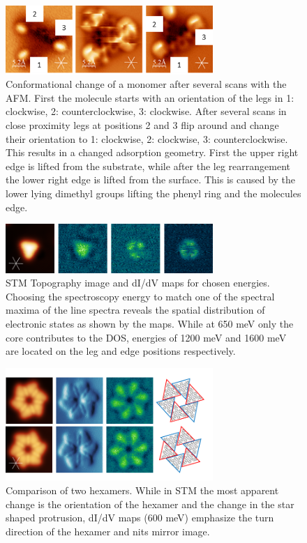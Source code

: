 \begin{figure}[] \centering
	\includegraphics[width=0.7\textwidth]{./images/hbbnc-ag-111-leg-flip}
	\caption{Conformational change of a monomer after several scans with the AFM. First the molecule starts with an orientation of the legs in 1: clockwise, 2: counterclockwise, 3: clockwise. After several scans in close proximity legs at positions 2 and 3 flip around and change their orientation to 1: clockwise, 2: clockwise, 3: counterclockwise. This results in a changed adsorption geometry. First the upper right edge is lifted from the substrate, while after the leg rearrangement the lower right edge is lifted from the surface. This is caused by the lower lying dimethyl groups lifting the phenyl ring and the molecules edge.}
	\label{fig:HBBNC-nc-AFM-legs-change}
\end{figure}

\begin{figure}[] \centering
	\includegraphics[width=0.7\textwidth]{./images/hbbnc-maps}
	\caption{STM Topography image and dI/dV maps for chosen energies. Choosing the spectroscopy energy to match one of the spectral maxima of the line spectra reveals the spatial distribution of electronic states as shown by the maps. While at 650 meV only the core contributes to the DOS, energies of 1200 meV and 1600 meV are located on the leg and edge positions respectively.}
	\label{fig:HBBNC-Ag111-dIdV-maps}
\end{figure}

\begin{figure}[] \centering
	\includegraphics[width=0.7\textwidth]{./images/hbbnc-maps2}
	\caption{Comparison of two hexamers. While in STM the most apparent change is the orientation of the hexamer and the change in the star shaped protrusion, dI/dV maps (600 meV) emphasize the turn direction of the hexamer and nits mirror image.}
	\label{}
\end{figure}

